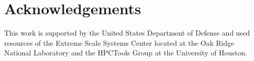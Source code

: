 \section{Acknowledgements}

This work is supported by the United States Department of Defense and
used resources of the Extreme Scale Systems Center located at the Oak
Ridge National Laboratory and the HPCTools Group at the University of
Houston.
